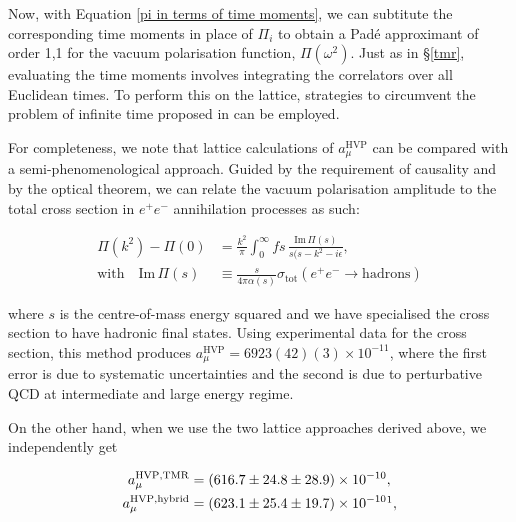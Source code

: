 \documentclass{article}
\numberwithin{equation}{section} %
\begin{document}
Now, with Equation \ref{pi in terms of time moments}, we can subtitute the corresponding time moments in place of $\Pi_i$ to obtain a Pad\'e approximant of order 1,1 for the vacuum polarisation function, $\Pi(\omega^2)$. Just as in \S \ref{tmr}, evaluating the time moments involves integrating the correlators over all Euclidean times. To perform this on the lattice, strategies to circumvent the problem of infinite time proposed in \cite{dellamorte} can be employed.

For completeness, we note that lattice calculations of $a_\mu^\mathrm{HVP}$ can be compared with a semi-phenomenological approach. Guided by the requirement of causality\cite{lehnerg2} and by the optical theorem\cite{jackson}, we can relate the vacuum polarisation amplitude to the total cross section in $e^+e^-$ annihilation processes as such:

\begin{equation}
\begin{split}
\Pi(k^2) - \Pi(0) &= \frac{k^2}{\pi}\int^\infty_0 fs\, \frac{\mathrm{Im}\, \Pi(s)}{s(s-k^2-i\epsilon},\\
\mathrm{with} \quad\mathrm{Im} \, \Pi(s) &\equiv \frac{s}{4\pi\alpha(s)}\sigma_\mathrm{tot}(e^+e^-\rightarrow \mathrm{hadrons})
\end{split}
\end{equation}

\noindent where $s$ is the centre-of-mass energy squared and we have specialised the cross section to have hadronic final states. Using experimental data for the cross section, this method produces $a_\mu^\mathrm{HVP}=6923(42)(3)\times 10^{-11}$, where the first error is due to systematic uncertainties and the second is due to perturbative QCD at intermediate and large energy regime\cite{hoecker}.

On the other hand, when we use the two lattice approaches derived above, we independently get\cite{dellamorte}

\begin{equation}
\begin{split}
a_\mu^\mathrm{HVP,TMR} &= (616.7 \pm 24.8 \pm 28.9) \times 10^{-10} ,\\
a_\mu^\mathrm{HVP,hybrid}&= (623.1 \pm 25.4 \pm 19.7) \times 10^{-10}\footnotemark , 
\end{split}
\end{equation}
\end{document}
